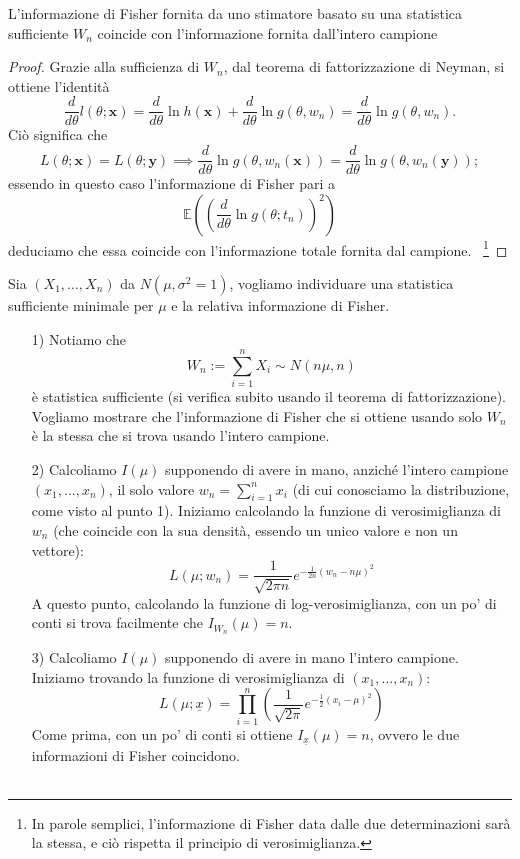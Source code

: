 \begin{thm}
L'informazione di Fisher fornita da uno stimatore basato su una statistica sufficiente \(W_n\) coincide con l'informazione fornita dall'intero campione
\end{thm}
\begin{proof}
  Grazie alla sufficienza di \(W_n\), dal teorema di fattorizzazione di Neyman, si ottiene l'identità
  \begin{equation*}
    \frac{d}{d\theta}l(\theta;\mathbf{x}) =
    \frac{d}{d\theta}\ln h(\mathbf{x}) + \frac{d}{d\theta} \ln g(\theta,w_n)
    = \frac{d}{d\theta} \ln g(\theta,w_n).
  \end{equation*}
  Ciò significa che
  \begin{equation*}
    L(\theta;\mathbf{x}) = L(\theta;\mathbf{y}) \implies
    \frac{d}{d\theta} \ln g(\theta,w_n(\mathbf{x})) =
    \frac{d}{d\theta} \ln g(\theta,w_n(\mathbf{y}));
  \end{equation*}
  essendo in questo caso l'informazione di Fisher pari a
  \begin{equation*}
    \mathbb{E}\left(\left(\frac{d}{d\theta}\ln g(\theta;t_n)\right)^2%
    \right)
  \end{equation*}
  deduciamo che essa coincide con l'informazione totale fornita dal campione.%
  ~\footnote{In parole semplici, l'informazione di Fisher data dalle due
  determinazioni sarà la stessa, e ciò rispetta il principio di verosimiglianza.}
\end{proof}

\begin{esempio} Sia $(X_1,\ldots,X_n)$ da $N(\mu,\sigma^2=1)$, vogliamo individuare una statistica sufficiente minimale per $\mu$ e la relativa informazione di Fisher.
\begin{enumerate}
\item[1)] Notiamo che 
$$W_n:=\sum_{i=1}^n X_i \sim N(n\mu,n)$$
è statistica sufficiente (si verifica subito usando il teorema di fattorizzazione).\\
Vogliamo mostrare che l'informazione di Fisher che si ottiene usando solo $W_n$ è la stessa che si trova usando l'intero campione.
\item[2)] Calcoliamo $I(\mu)$ supponendo di avere in mano, anziché l'intero campione $(x_1,...,x_n)$, il solo valore $w_n=\sum_{i=1}^n x_i$ (di cui conosciamo la distribuzione, come visto al punto 1). Iniziamo calcolando la funzione di verosimiglianza di $w_n$ (che coincide con la sua densità, essendo un unico valore e non un vettore):
$$L(\mu; w_n)=\frac{1}{\sqrt{2 \pi n}} e^{-\frac{1}{2n} (w_n-n\mu)^2}$$
A questo punto, calcolando la funzione di log-verosimiglianza, con un po' di conti si trova facilmente che $I_{W_n}(\mu)=n$.
\item[3)] Calcoliamo $I(\mu)$ supponendo di avere in mano l'intero campione. Iniziamo trovando la funzione di verosimiglianza di $(x_1,...,x_n)$:
$$L(\mu; \underline{x})= \prod_{i=1}^n \left( \frac{1}{\sqrt{2 \pi}} e^{-\frac{1}{2}(x_i-\mu)^2} \right)$$
Come prima, con un po' di conti si ottiene $I_{\underline{x}}(\mu)=n$, ovvero le due informazioni di Fisher coincidono.
\\
\\
\end{enumerate}
\end{esempio}